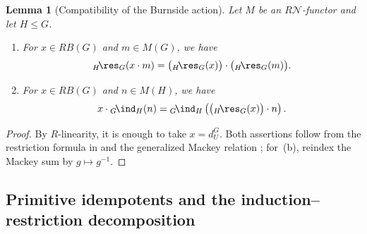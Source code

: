 \documentclass{amsart}
\numberwithin{equation}{section}%
\newtheorem{Lem}[equation]{Lemma}
\theoremstyle{remark}
\theoremstyle{definition}
\newcommand{\n}{\mathcal N}
\newcommand{\lind}[1]{{}_{#1}\!\ind}
\newcommand{\lres}[1]{{}_{#1}\!\res}
\begin{document}
%
\begin{Lem}[Compatibility of the Burnside action]
\label{lem:Burnside-action-compatibility}
Let $M$ be an $R\n$-functor and let $H\leq G$.
%
\begin{enumerate}
\item[(a)] For $x\in RB(G)$ and $m\in M(G)$, we have
%
\[
{}\lres{H}_G(x\cdot m)
=
\bigl({}\lres{H}_G(x)\bigr)\cdot\bigl(\lres{H}_G(m)\bigr).
\]
%
\item[(b)] For $x\in RB(G)$ and $n\in M(H)$, we have
%
\[
x\cdot{}\lind{G}_H(n)
=
{}\lind{G}_H
\left(
\bigl({}\lres{H}_G(x)\bigr)\cdot n
\right).
\]
\end{enumerate}
\end{Lem}
%
\begin{proof}
By $R$-linearity, it is enough to take $x=d_U^G$.
Both assertions follow from the restriction formula in
 and the generalized Mackey relation
; for~(b), reindex the
Mackey sum by $g\mapsto g^{-1}$.
\end{proof}




%
\subsection{Primitive idempotents and the induction--restriction decomposition}\
\label{ssec:Burnside-idempotent-decomposition}
%
\end{document}
